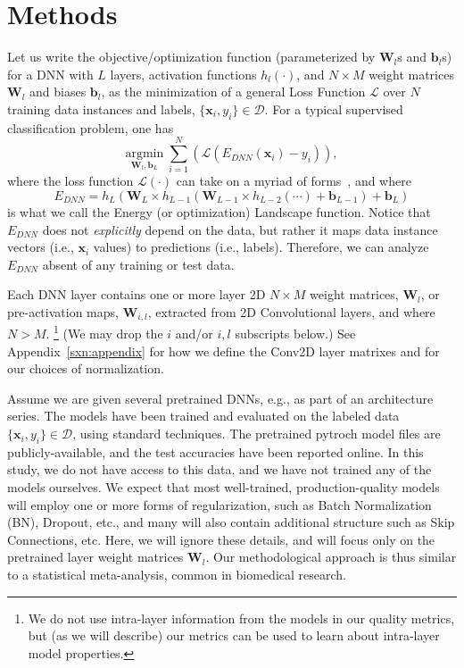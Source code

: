 \section{Methods}
\label{sxn:methods}


Let us write the objective/optimization function (parameterized by $\mathbf{W}_{l}$s and $\mathbf{b}_{l}$s) for a DNN with $L$ layers, activation functions $h_{l}(\cdot)$, and $N\times M$ weight matrices $\mathbf{W}_{l}$ and biases $\mathbf{b}_{l}$, as 
the minimization of a general Loss Function $\mathcal{L}$ over $N$ training data instances and labels, $\{\mathbf{x}_{i},y_{i}\}\in\mathcal{D}$.
For a typical supervised classification problem, one has
\begin{equation}
\underset{\mathbf{W}_{l},\mathbf{b}_{L}}{\text{argmin}}\;\sum_{i=1}^{N}\left(\mathcal{L}(E_{DNN}(\mathbf{x}_{i})-y_{i})\right)  ,
\end{equation}
where the loss function $\mathcal{L}(\cdot)$ can take on a myriad of forms~\cite{JC17_TR}, and where
\begin{equation}
E_{DNN}=h_{L}(\mathbf{W}_{L}\times h_{L-1}(\mathbf{W}_{L-1}\times h_{L-2}(\cdots)+\mathbf{b}_{L-1})+\mathbf{b}_{L})
\label{eqn:dnn_energy}
\end{equation}
is what we call the Energy (or optimization) Landscape function.  
Notice that $E_{DNN}$ does not \emph{explicitly} depend on the data, but rather it maps data instance vectors (i.e., $\mathbf{x}_i$ values) to predictions (i.e., labels).
Therefore, we can analyze $E_{DNN}$ absent of any training or test data. 


Each DNN layer contains one or more layer 2D  $N\times M$ weight matrices, $\mathbf{W}_{l}$, or pre-activation maps, $\mathbf{W}_{i,l}$, extracted from 2D Convolutional layers, and where $N > M$.%
\footnote{We do not use intra-layer information from the models in our quality metrics, but (as we will describe) our metrics can be used to learn about intra-layer model properties.}
(We may drop the $i$ and/or $i,l$ subscripts below.)
See Appendix~\ref{sxn:appendix} for how we define the Conv2D layer matrixes and for our choices of normalization. 

Assume we are given several pretrained DNNs, e.g., as part of an architecture series.
The models have been trained and evaluated on the labeled data $\{\mathbf{x}_{i},y_{i}\}\in\mathcal{D}$, using standard techniques.  
The pretrained pytroch model files are publicly-available, and the test accuracies have been reported online.  
In this study, we do not have access to this data, and we have not trained any of the models ourselves. 
We expect that most well-trained, production-quality models will employ one or more forms of regularization, such as Batch Normalization (BN), Dropout, etc., and many will also contain additional structure such as Skip Connections, etc. 
Here, we will ignore these details, and will focus only on the pretrained layer weight matrices $\mathbf{W}_{l}$.
Our methodological approach is thus similar to a statistical meta-analysis, common in biomedical research.


